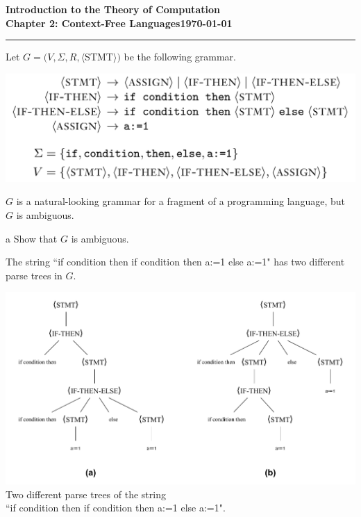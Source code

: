 \documentclass[11pt]{article}
\newcommand{\dated}{\today}
\begin{document}
\textbf{Introduction to the Theory of
Computation}\hfill\textbf{\myname}\\[0.01in]
\textbf{Chapter 2: Context-Free Languages}\hfill\textbf{\dated}\\
\smallskip\hrule\bigskip

\begin{problem}{2.27}
Let $G = (V, \Sigma, R, \langle$STMT$\rangle)$ be the following grammar.
\begin{center}
\includegraphics[scale=0.4]{Figures/Problem2.27a.pdf} \\
\end{center}
$G$ is a natural-looking grammar for a fragment of a programming language, but $G$ is ambiguous.
\end{problem}

\begin{problem}[Part]{a}
Show that $G$ is ambiguous.
\end{problem}

The string ``if condition then if condition then a:=1 else a:=1" has two different parse trees in $G$.
\begin{center}
\includegraphics[scale=0.7]{Figures/Problem2.27b.pdf} \\
Two different parse trees of the string \\
``if condition then if condition then a:=1 else a:=1".
\end{center}
\end{document}
